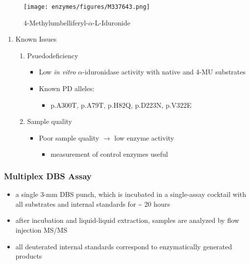 \documentclass[12pt]{scrartcl}
\begin{document}
\begin{figure}[htbp]
\centering
\texttt{[image: enzymes/figures/M337643.png]}
\caption[4MUI]{\label{fig:org82c9566}4-Methylumbelliferyl-\(\alpha\)-L-Iduronide}
\end{figure}

\begin{enumerate}
\item Known Issues
\label{sec:orgb834f25}
\begin{enumerate}
\item Psuedodeficiency
\label{sec:orgd51f8be}
\begin{itemize}
\item Low \emph{in vitro} \(\alpha\)-iduronidase activity with native and 4-MU
substrates
\item Known PD alleles:
\begin{itemize}
\item p.A300T, p.A79T, p.H82Q, p.D223N, p.V322E
\end{itemize}
\end{itemize}

\item Sample quality
\label{sec:org0881a0b}
\begin{itemize}
\item Poor sample quality \(\to\) low enzyme activity
\begin{itemize}
\item measurement of control enzymes useful
\end{itemize}
\end{itemize}
\end{enumerate}
\end{enumerate}

\subsubsection{Multiplex DBS Assay}
\label{sec:org2df9504}
\begin{itemize}
\item a single 3-mm DBS punch, which is incubated in a single-assay
cocktail with all substrates and internal standards for \textasciitilde{} 20 hours
\item after incubation and liquid-liquid extraction, samples are analyzed by flow injection MS/MS
\item all deuterated internal standards correspond to enzymatically generated products
\end{itemize}
\end{document}
